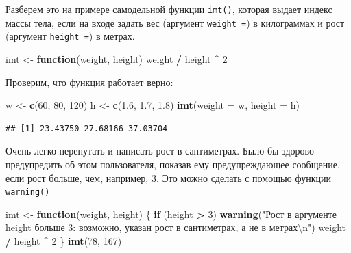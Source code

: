 \documentclass[]{book}
\newenvironment{Shaded}{\begin{snugshade}}{\end{snugshade}}
\newcommand{\KeywordTok}[1]{\textcolor[rgb]{0.13,0.29,0.53}{\textbf{#1}}}
\newcommand{\DataTypeTok}[1]{\textcolor[rgb]{0.13,0.29,0.53}{#1}}
\newcommand{\DecValTok}[1]{\textcolor[rgb]{0.00,0.00,0.81}{#1}}
\newcommand{\FloatTok}[1]{\textcolor[rgb]{0.00,0.00,0.81}{#1}}
\newcommand{\CharTok}[1]{\textcolor[rgb]{0.31,0.60,0.02}{#1}}
\newcommand{\StringTok}[1]{\textcolor[rgb]{0.31,0.60,0.02}{#1}}
\newcommand{\ControlFlowTok}[1]{\textcolor[rgb]{0.13,0.29,0.53}{\textbf{#1}}}
\newcommand{\OperatorTok}[1]{\textcolor[rgb]{0.81,0.36,0.00}{\textbf{#1}}}
\newcommand{\NormalTok}[1]{#1}
\begin{document}
Разберем это на примере самодельной функции \texttt{imt()}, которая
выдает индекс массы тела, если на входе задать вес (аргумент
\texttt{weight\ =}) в килограммах и рост (аргумент \texttt{height\ =}) в
метрах.

\begin{Shaded}
\begin{Highlighting}[]
\NormalTok{imt <-}\StringTok{ }\ControlFlowTok{function}\NormalTok{(weight, height) weight }\OperatorTok{/}\StringTok{ }\NormalTok{height }\OperatorTok{^}\StringTok{ }\DecValTok{2}
\end{Highlighting}
\end{Shaded}

Проверим, что функция работает верно:

\begin{Shaded}
\begin{Highlighting}[]
\NormalTok{w <-}\StringTok{ }\KeywordTok{c}\NormalTok{(}\DecValTok{60}\NormalTok{, }\DecValTok{80}\NormalTok{, }\DecValTok{120}\NormalTok{)}
\NormalTok{h <-}\StringTok{ }\KeywordTok{c}\NormalTok{(}\FloatTok{1.6}\NormalTok{, }\FloatTok{1.7}\NormalTok{, }\FloatTok{1.8}\NormalTok{)}
\KeywordTok{imt}\NormalTok{(}\DataTypeTok{weight =}\NormalTok{ w, }\DataTypeTok{height =}\NormalTok{ h)}
\end{Highlighting}
\end{Shaded}

\begin{verbatim}
## [1] 23.43750 27.68166 37.03704
\end{verbatim}

Очень легко перепутать и написать рост в сантиметрах. Было бы здорово
предупредить об этом пользователя, показав ему предупреждающее
сообщение, если рост больше, чем, например, 3. Это можно сделать с
помощью функции \texttt{warning()}

\begin{Shaded}
\begin{Highlighting}[]
\NormalTok{imt <-}\StringTok{ }\ControlFlowTok{function}\NormalTok{(weight, height) \{}
  \ControlFlowTok{if}\NormalTok{ (height }\OperatorTok{>}\StringTok{ }\DecValTok{3}\NormalTok{) }\KeywordTok{warning}\NormalTok{(}\StringTok{"Рост в аргументе height больше 3: возможно, указан рост в сантиметрах, а не в метрах}\CharTok{\textbackslash{}n}\StringTok{"}\NormalTok{)}
\NormalTok{  weight }\OperatorTok{/}\StringTok{ }\NormalTok{height }\OperatorTok{^}\StringTok{ }\DecValTok{2}
\NormalTok{\}}
\KeywordTok{imt}\NormalTok{(}\DecValTok{78}\NormalTok{, }\DecValTok{167}\NormalTok{)}
\end{Highlighting}
\end{Shaded}
\end{document}
